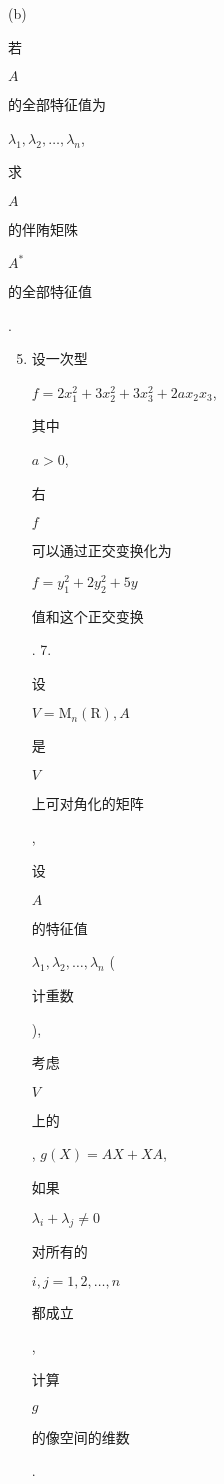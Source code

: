 \documentclass[10pt]{article}
\begin{document}
(b) \begin{CJK}{UTF8}{mj}若\end{CJK} $A$ \begin{CJK}{UTF8}{mj}的全部特征值为\end{CJK} $\lambda_{1}, \lambda_{2}, \ldots, \lambda_{n}$, \begin{CJK}{UTF8}{mj}求\end{CJK} $A$ \begin{CJK}{UTF8}{mj}的伴陏矩陎\end{CJK} $A^{*}$ \begin{CJK}{UTF8}{mj}的全部特征值\end{CJK}.

\begin{enumerate}
  \setcounter{enumi}{4}
  \item \begin{CJK}{UTF8}{mj}设一次型\end{CJK} $f=2 x_{1}^{2}+3 x_{2}^{2}+3 x_{3}^{2}+2 a x_{2} x_{3}$, \begin{CJK}{UTF8}{mj}其中\end{CJK} $a>0$, \begin{CJK}{UTF8}{mj}右\end{CJK} $f$ \begin{CJK}{UTF8}{mj}可以通过正交变换化为\end{CJK} $f=y_{1}^{2}+2 y_{2}^{2}+5 y$ \begin{CJK}{UTF8}{mj}值和这个正交变换\end{CJK}. 7. \begin{CJK}{UTF8}{mj}设\end{CJK} $V=\mathrm{M}_{n}(\mathrm{R}), A$ \begin{CJK}{UTF8}{mj}是\end{CJK} $V$ \begin{CJK}{UTF8}{mj}上可对角化的矩阵\end{CJK}, \begin{CJK}{UTF8}{mj}设\end{CJK} $A$ \begin{CJK}{UTF8}{mj}的特征值\end{CJK} $\lambda_{1}, \lambda_{2}, \ldots, \lambda_{n}$ (\begin{CJK}{UTF8}{mj}计重数\end{CJK}), \begin{CJK}{UTF8}{mj}考虑\end{CJK} $V$ \begin{CJK}{UTF8}{mj}上的\end{CJK}, $g(X)=A X+X A$, \begin{CJK}{UTF8}{mj}如果\end{CJK} $\lambda_{i}+\lambda_{j} \neq 0$ \begin{CJK}{UTF8}{mj}对所有的\end{CJK} $i, j=1,2, \ldots, n$ \begin{CJK}{UTF8}{mj}都成立\end{CJK}, \begin{CJK}{UTF8}{mj}计算\end{CJK} $g$ \begin{CJK}{UTF8}{mj}的像空间的维数\end{CJK}.


\end{enumerate}
\end{document}
